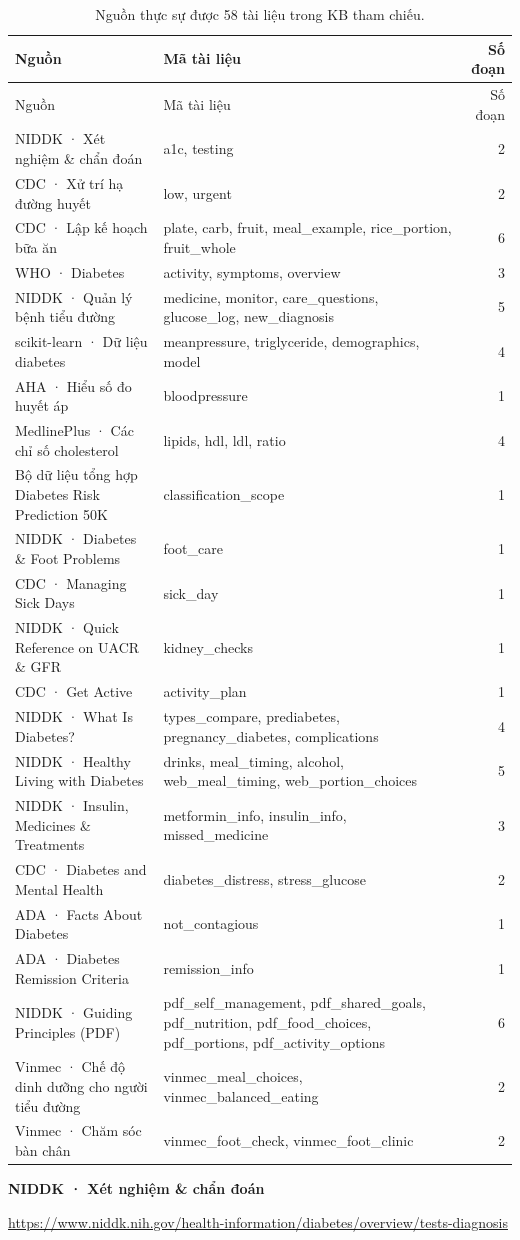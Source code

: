 \begin{longtable}{p{5cm}p{8cm}r}\caption{Nguồn thực sự được 58 tài liệu trong KB tham chiếu.}\label{tab:kb-sources}\\\toprule Nguồn & Mã tài liệu & Số đoạn\\\midrule\endfirsthead\toprule Nguồn & Mã tài liệu & Số đoạn\\\midrule\endhead
NIDDK · Xét nghiệm \& chẩn đoán & a1c, testing & 2\\
CDC · Xử trí hạ đường huyết & low, urgent & 2\\
CDC · Lập kế hoạch bữa ăn & plate, carb, fruit, meal\_example, rice\_portion, fruit\_whole & 6\\
WHO · Diabetes & activity, symptoms, overview & 3\\
NIDDK · Quản lý bệnh tiểu đường & medicine, monitor, care\_questions, glucose\_log, new\_diagnosis & 5\\
scikit-learn · Dữ liệu diabetes & meanpressure, triglyceride, demographics, model & 4\\
AHA · Hiểu số đo huyết áp & bloodpressure & 1\\
MedlinePlus · Các chỉ số cholesterol & lipids, hdl, ldl, ratio & 4\\
Bộ dữ liệu tổng hợp Diabetes Risk Prediction 50K & classification\_scope & 1\\
NIDDK · Diabetes \& Foot Problems & foot\_care & 1\\
CDC · Managing Sick Days & sick\_day & 1\\
NIDDK · Quick Reference on UACR \& GFR & kidney\_checks & 1\\
CDC · Get Active & activity\_plan & 1\\
NIDDK · What Is Diabetes? & types\_compare, prediabetes, pregnancy\_diabetes, complications & 4\\
NIDDK · Healthy Living with Diabetes & drinks, meal\_timing, alcohol, web\_meal\_timing, web\_portion\_choices & 5\\
NIDDK · Insulin, Medicines \& Treatments & metformin\_info, insulin\_info, missed\_medicine & 3\\
CDC · Diabetes and Mental Health & diabetes\_distress, stress\_glucose & 2\\
ADA · Facts About Diabetes & not\_contagious & 1\\
ADA · Diabetes Remission Criteria & remission\_info & 1\\
NIDDK · Guiding Principles (PDF) & pdf\_self\_management, pdf\_shared\_goals, pdf\_nutrition, pdf\_food\_choices, pdf\_portions, pdf\_activity\_options & 6\\
Vinmec · Chế độ dinh dưỡng cho người tiểu đường & vinmec\_meal\_choices, vinmec\_balanced\_eating & 2\\
Vinmec · Chăm sóc bàn chân & vinmec\_foot\_check, vinmec\_foot\_clinic & 2\\\bottomrule\end{longtable}\noindent\textbf{NIDDK · Xét nghiệm \& chẩn đoán}\par\noindent\url{https://www.niddk.nih.gov/health-information/diabetes/overview/tests-diagnosis}\par\medskip

